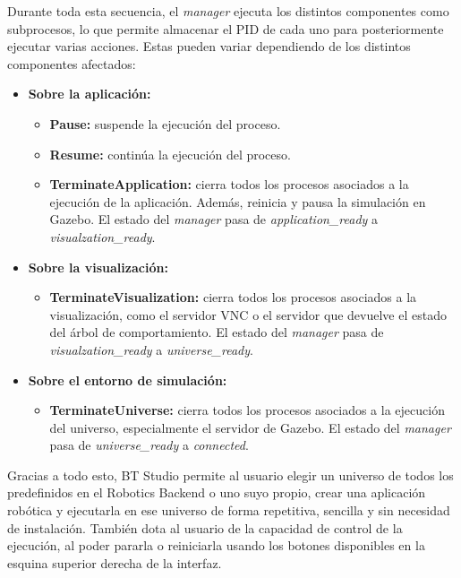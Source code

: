 Durante toda esta secuencia, el \textit{manager} ejecuta los distintos componentes como subprocesos, lo que permite almacenar el PID de cada uno para posteriormente ejecutar varias acciones. Estas pueden variar dependiendo de los distintos componentes afectados: 

\begin{itemize}
    \item \textbf{Sobre la aplicación:}
    \begin{itemize}
        \item \textbf{Pause:} suspende la ejecución del proceso.
        \item \textbf{Resume:} continúa la ejecución del proceso.
        \item \textbf{TerminateApplication:} cierra  todos los procesos asociados a la ejecución de la aplicación. Además, reinicia y pausa la simulación en Gazebo. El estado del \textit{manager} pasa de \textit{application\_ready} a \textit{visualzation\_ready}. 
    \end{itemize}

    \item \textbf{Sobre la visualización:}
    \begin{itemize}
        \item \textbf{TerminateVisualization:} cierra todos los procesos asociados a la visualización, como el servidor VNC o el servidor que devuelve el estado del árbol de comportamiento. El estado del \textit{manager} pasa de \textit{visualzation\_ready} a \textit{universe\_ready}. 
    \end{itemize}

    \item \textbf{Sobre el entorno de simulación:}
    \begin{itemize}
        \item \textbf{TerminateUniverse:} cierra todos los procesos asociados a la ejecución del universo, especialmente el servidor de Gazebo. El estado del \textit{manager} pasa de \textit{universe\_ready} a \textit{connected}. 
    \end{itemize}
    
\end{itemize}

Gracias a todo esto, BT Studio permite al usuario elegir un universo de todos los predefinidos en el Robotics Backend o uno suyo propio, crear una aplicación robótica y ejecutarla en ese universo de forma repetitiva, sencilla y sin necesidad de instalación. También dota al usuario de la capacidad de control de la ejecución, al poder pararla o reiniciarla usando los botones disponibles en la esquina superior derecha de la interfaz.

